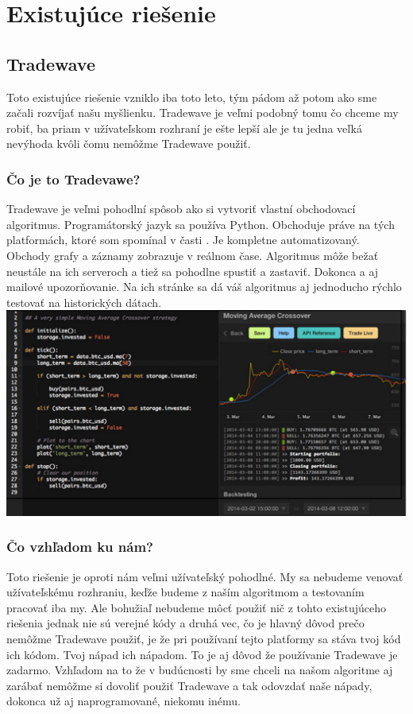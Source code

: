 \section{Existujúce riešenie} 
\subsection{Tradewave} 
Toto existujúce riešenie vzniklo iba toto leto, tým pádom až potom ako sme začali rozvíjať našu myšlienku. Tradewave je veľmi podobný tomu čo chceme my robiť, ba priam v užívateľskom rozhraní je ešte lepší ale je tu jedna veľká nevýhoda kvôli čomu nemôžme Tradewave použiť.  
\subsubsection{Čo je to Tradevawe?}
Tradewave je veľmi pohodlní spôsob ako si vytvoriť vlastní obchodovací algoritmus. Programátorský jazyk sa používa Python. Obchoduje práve na tých platformách, ktoré som spomínal v časti . Je kompletne automatizovaný. Obchody grafy a záznamy zobrazuje v reálnom čase. Algoritmus môže bežať neustále na ich serveroch a tiež sa pohodlne spustiť a zastaviť. Dokonca a aj mailové upozorňovanie. Na ich stránke sa dá váš algoritmus aj jednoducho rýchlo testovať na historických dátach.  \cite{Tw} 
\includegraphics[width=1\textwidth]{trade} 
\subsubsection{Čo vzhľadom ku nám?}
Toto riešenie je oproti nám veľmi užívateľský pohodlné. My sa nebudeme venovať užívateľskému rozhraniu, keďže budeme z naším algoritmom a testovaním  pracovať iba my. Ale bohužiaľ nebudeme môcť použiť nič z tohto existujúceho riešenia jednak nie sú verejné kódy a druhá vec, čo je hlavný dôvod prečo nemôžme Tradewave použiť, je že pri používaní tejto platformy sa stáva tvoj kód ich kódom. Tvoj nápad ich nápadom. To je aj dôvod že používanie Tradewave je zadarmo. Vzhľadom na to že v budúcnosti by sme chceli na našom algoritme aj zarábať nemôžme si dovoliť použiť Tradewave a tak odovzdať naše nápady, dokonca už aj naprogramované, niekomu inému.
